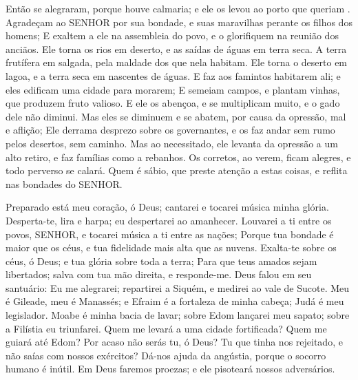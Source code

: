 {  Então se alegraram, porque houve calmaria; e ele os levou ao porto que queriam
{} .
  Agradeçam ao SENHOR por sua bondade, e suas maravilhas perante os filhos dos homens;
  E exaltem a ele na assembleia do povo, e o glorifiquem na reunião dos anciãos.
  Ele torna os rios em deserto, e as saídas de águas em terra seca.
  A terra frutífera em salgada, pela maldade dos que nela habitam.
  Ele torna o deserto em lagoa, e a terra seca em nascentes de águas.
  E faz aos famintos habitarem ali; e eles edificam uma cidade para morarem;
  E semeiam campos, e plantam vinhas, que produzem fruto valioso.
  E ele os abençoa, e se multiplicam muito, e o gado dele não diminui.
  Mas
{} eles se diminuem e se abatem, por causa da opressão, mal e aflição;
  Ele derrama desprezo sobre os governantes, e os faz andar sem rumo pelos desertos, sem
{} caminho.
  Mas ao necessitado, ele levanta da opressão a um alto retiro, e faz famílias como a rebanhos.
  Os corretos, ao verem, ficam alegres, e todo perverso se calará.
  Quem é sábio, que preste atenção a estas coisas, e reflita nas bondades do SENHOR.
\par }


{\PP 
  Preparado está meu coração, ó Deus; cantarei e tocarei música
{} minha glória.
  Desperta-te, lira e harpa; eu despertarei ao amanhecer.
  Louvarei a ti entre os povos, SENHOR, e tocarei música a ti entre as nações;
  Porque tua bondade é maior que os céus, e tua fidelidade mais alta que as nuvens.
  Exalta-te sobre os céus, ó Deus; e tua glória sobre toda a terra;
  Para que teus amados sejam libertados; salva
{} com tua mão direita, e responde-me.
  Deus falou em seu santuário: Eu me alegrarei; repartirei a Siquém, e medirei ao vale de Sucote.
  Meu é Gileade, meu é Manassés; e Efraim é a fortaleza de minha cabeça; Judá é meu legislador.
  Moabe é minha bacia de lavar; sobre Edom lançarei meu sapato; sobre a Filístia eu triunfarei.
  Quem me levará a uma cidade fortificada? Quem me guiará até Edom?
  Por acaso não serás tu, ó Deus? Tu que tinha nos rejeitado, e não saías
{} com nossos exércitos?
  Dá-nos ajuda
{} da angústia, porque o socorro humano é inútil.
  Em Deus faremos proezas; e ele pisoteará nossos adversários.
\par }

